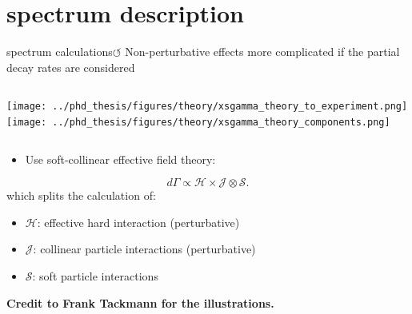 \documentclass[xcolor=dvipsnames]{beamer}
\begin{document}
\section{\safeBtoXsgamma spectrum description}


\begin{frame}{\safeBtoXsdgamma spectrum calculations\hyperlink{frame:A}{$\circlearrowleft$}}
\scriptsize
   Non-perturbative effects more complicated if the partial decay rates are considered

   \begin{columns}
      \texttt{[image: ../phd\_thesis/figures/theory/xsgamma\_theory\_to\_experiment.png]}
      \texttt{[image: ../phd\_thesis/figures/theory/xsgamma\_theory\_components.png]}
   \end{columns}

   \begin{itemize}
      \item Use soft-collinear effective field theory:
   \end{itemize}
   \begin{equation}\nonumber
      d\Gamma \propto \mathcal{H} \times \mathcal{J} \otimes \mathcal{S}.
  \end{equation}
  which splits the calculation of:
  \begin{itemize}
   \item[] {\color{red}$\mathcal{H}$: effective hard interaction (perturbative)}
   \item[] {\color{blue}$\mathcal{J}$: collinear particle interactions (perturbative)}
   \item[] {\color{orange}$\mathcal{S}$: soft particle interactions}
  \end{itemize}

\vspace{-10pt}

\begin{flushright}
   \tiny \textbf{Credit to Frank Tackmann for the illustrations.}
\end{flushright}

\end{frame}
\end{document}
